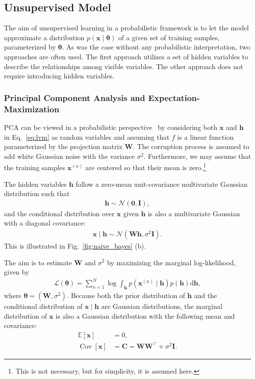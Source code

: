 \documentclass{now}
\newcommand{\vect}[1]{\mathbf{#1}}
\newcommand{\vects}[1]{\boldsymbol{#1}}
\newcommand{\matr}[1]{\mathbf{#1}}
\newcommand{\cov}[0]{\operatorname{Cov}}
\newcommand{\vh}[0]{\vect{h}}
\newcommand{\vx}[0]{\vect{x}}
\newcommand{\mW}[0]{\matr{W}}
\newcommand{\mC}{\matr{C}}
\newcommand{\mI}{\matr{I}}
\newcommand{\vzero}[0]{\vects{0}}
\newcommand{\TT}[0]{{\vects{\theta}}}
\newcommand{\NN}[0]{\mathcal{N}}
\newcommand{\LL}[0]{\mathcal{L}}
\newcommand{\E}[0]{\mathbb{E}}
\newcommand{\dd}[1]{\text{d}{#1}}
\begin{document}
\subsection{Unsupervised Model}

The aim of unsupervised learning in a probabilistic framework is to let the
model approximate a distribution $p(\vx \mid \TT)$ of a given set of training
samples, parameterized by $\TT$. As was the case without any probabilistic
interpretation, two approaches are often used.  The first approach utilizes a
set of hidden variables to describe the relationships among visible variables.
The other approach does not require introducing hidden variables.

\subsubsection{Principal Component Analysis and Expectation-Maximization}
\label{sec:ppca}

PCA can be viewed in a probabilistic perspective~\citep[see,
e.g.,][]{Tipping1999,Roweis1998} by considering both $\vx$ and $\vh$ in
Eq.~\eqref{eq:lvm} as random variables and assuming that $f$ is a linear
function parameterized by the projection matrix $\mW$. The corruption process is
assumed to add white Gaussian noise with the variance $\sigma^2$.
Furthermore, we may assume that the training samples $\vx^{(n)}$ are centered so
that their mean is zero.\footnote{
    This is not necessary, but for simplicity, it is assumed here.
}

The hidden variables $\vh$ follow a zero-mean unit-covariance multivariate
Gaussian distribution such that
\begin{align*}
    \vh \sim \NN(\vzero, \mI),
\end{align*}
and the conditional distribution over $\vx$ given $\vh$ is also a multivariate
Gaussian with a diagonal covariance:
\begin{align*}
    \vx \mid \vh \sim \NN(\mW \vh, \sigma^2 \mI).
\end{align*}
This is illustrated in Fig.~\ref{fig:naive_bayes} (b).

The aim is to estimate $\mW$ and $\sigma^2$ by maximizing the marginal
log-likelihood, given by
\begin{align}
    \label{eq:ppca_mll}
    \LL(\TT) = \sum_{n=1}^N \log \int_{\vh} p(\vx^{(n)} \mid \vh)
    p(\vh) \dd{\vh},
\end{align}
where $\TT=\left( \mW, \sigma^2 \right)$. Because both the prior distribution of
$\vh$ and the conditional distribution of $\vx \mid \vh$ are Gaussian
distributions, the marginal distribution of $\vx$ is also a Gaussian
distribution with the following mean and covariance:
\begin{align*}
    \E\left[ \vx \right] &= 0,\\
    \cov\left[ \vx \right] &= \mC = \mW \mW^\top + \sigma^2 \mI.
\end{align*}
\end{document}
